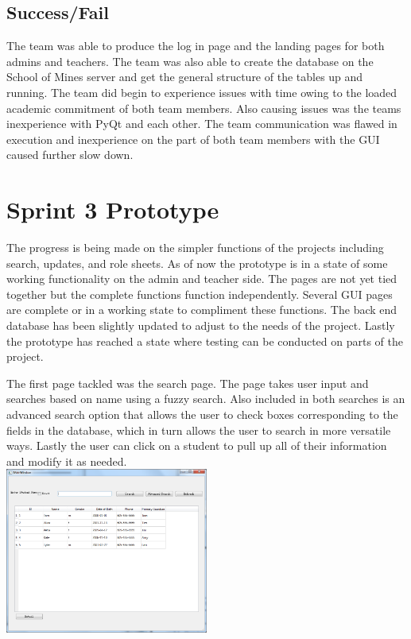 \subsection{Success/Fail}
The team was able to produce the log in page and the landing pages for both admins and teachers. The team was also able to create the database on the School of Mines server and get the general structure of the tables up and running. The team did begin to experience issues with time owing to the loaded academic commitment of both team members. Also causing issues was the teams inexperience with PyQt and each other. The team communication was flawed in execution and inexperience on the part of both team members with the GUI caused further slow down.\\


\section{Sprint 3 Prototype}
The progress is being made on the simpler functions of the projects including search, updates, and role sheets. As of now the prototype is in a state of some working functionality on the admin and teacher side. The pages are not yet tied together but the complete functions function independently. Several GUI pages are complete or in a working state to compliment these functions. The back end database has been slightly updated to adjust to the needs of the project. Lastly the prototype has reached a state where testing can be conducted on parts of the project.

The first page tackled was the search page. The page takes user input and searches based on name using a fuzzy search. Also included in both searches is an advanced search option that allows the user to check boxes corresponding to the fields in the database, which in turn allows the user to search in more versatile ways. Lastly the user can click on a student to pull up all of their information and modify it as needed.\\

\includegraphics[width=0.5\textwidth]{search.png}

